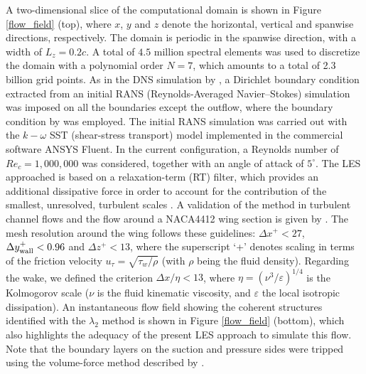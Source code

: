 \documentclass[preprint,12pt,authoryear]{elsarticle}
\begin{document}
A two-dimensional slice of the computational domain is shown in Figure \ref{flow_field} (top), where $x$, $y$ and $z$ denote the horizontal, vertical and spanwise directions, respectively. The domain is periodic in the spanwise direction, with a width of $L_{z}=0.2c$. A total of $4.5$ million spectral elements was used to discretize the domain with a polynomial order $N=7$, which amounts to a total of 2.3 billion grid points. As in the DNS simulation by \cite{hosseini_et_al}, a Dirichlet boundary condition extracted from an initial RANS (Reynolds-Averaged Navier--Stokes) simulation was imposed on all the boundaries except the outflow, where the boundary condition by \cite{dong_et_al} was employed. The initial RANS simulation was carried out with the $k-\omega$ SST (shear-stress transport) model \citep{menter} implemented in the commercial software ANSYS Fluent. In the current configuration, a Reynolds number of $Re_{c}=1,000,000$ was considered, together with an angle of attack of $5^{\circ}$. The LES approached is based on a relaxation-term (RT) filter, which provides an additional dissipative force in order to account for the contribution of the smallest, unresolved, turbulent scales \citep{schlatter_et_al_2004}. A validation of the method in turbulent channel flows and the flow around a NACA4412 wing section is given by \cite{negi_et_al}.  The mesh resolution around the wing follows these guidelines: $\Delta x^{+} < 27$, $\Delta y^{+}_{{\rm wall}} < 0.96$ and $\Delta z^{+} < 13$, where the superscript `+' denotes scaling in terms of the friction velocity $u_{\tau}=\sqrt{\tau_{w} / \rho}$ (with $\rho$ being the fluid density). Regarding the wake, we defined the criterion $\Delta x / \eta < 13$, where $\eta=\left ( \nu^{3} / \varepsilon \right )^{1/4}$ is the Kolmogorov scale ($\nu$ is the fluid kinematic viscosity, and $\varepsilon$ the local isotropic dissipation). An instantaneous flow field showing the coherent structures identified with the $\lambda_{2}$ method \citep{jeong_hussain} is shown in Figure \ref{flow_field} (bottom), which also highlights the adequacy of the present LES approach to simulate this flow. Note that the boundary layers on the suction and pressure sides were tripped using the volume-force method described by \cite{schlatter_orlu12}.
\end{document}
